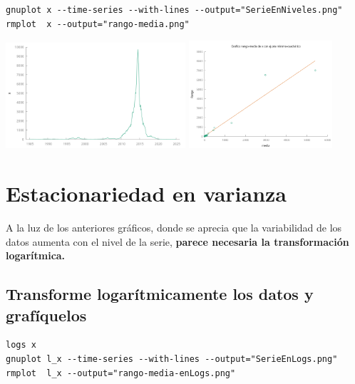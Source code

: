 \documentclass[10pt]{article}
\begin{document}
\begin{verbatim}
gnuplot x --time-series --with-lines --output="SerieEnNiveles.png"
rmplot  x --output="rango-media.png"
\end{verbatim}

\begin{center}
\includegraphics[width=0.5\textwidth]{./EjercicioIdentificacionARIMA/SerieEnNiveles.png}
\includegraphics[width=0.4\textwidth]{./EjercicioIdentificacionARIMA/rango-media.png} 
\end{center}
\section*{Estacionariedad en varianza}
\label{sec:org3502080}

A la luz de los anteriores gráficos, donde se aprecia que la
variabilidad de los datos aumenta con el nivel de la serie, \textbf{parece
necesaria la transformación logarítmica.}
\subsection*{Transforme logarítmicamente los datos y grafíquelos}
\label{sec:org664dfbf}

\begin{verbatim}
logs x
gnuplot l_x --time-series --with-lines --output="SerieEnLogs.png"
rmplot  l_x --output="rango-media-enLogs.png"
\end{verbatim}
\end{document}
